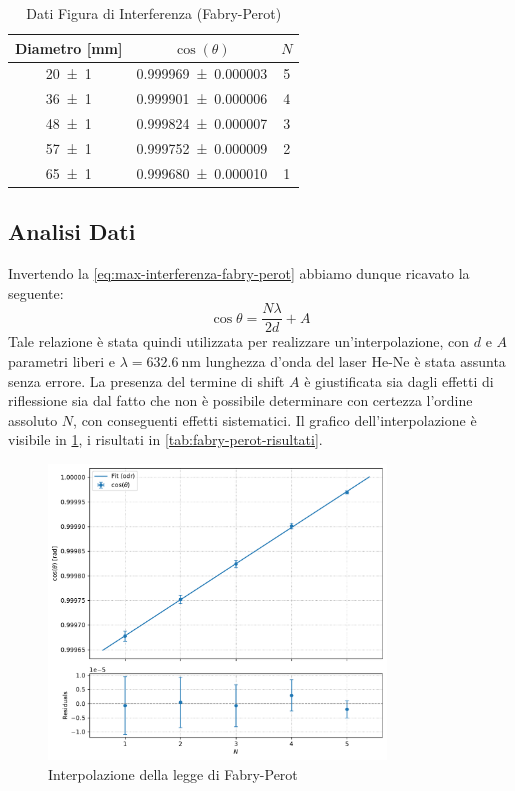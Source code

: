 \documentclass[a4paper]{article}
\begin{document}
\begin{table}[htbp]
\centering
\caption{Dati Figura di Interferenza (Fabry-Perot)}
\begin{tabular}{|c|c|c|}
\hline
Diametro [\si{\milli\meter}] & $\cos(\theta)$ & $N$ \\\hline\hline
\num{20 \pm 1} & \num{0.999969 \pm 0.000003}  & 5 \\
\num{36 \pm 1} & \num{0.999901 \pm 0.000006}  & 4 \\
\num{48 \pm 1} & \num{0.999824 \pm 0.000007}  & 3 \\
\num{57 \pm 1} & \num{0.999752 \pm 0.000009}  & 2 \\
\num{65 \pm 1} & \num{0.999680 \pm 0.000010}  & 1 \\
\hline
\end{tabular}
\label{tab:fabry-perot-dati}
\end{table}


\subsection{Analisi Dati}
Invertendo la \cref{eq:max-interferenza-fabry-perot} abbiamo dunque ricavato la seguente:
\[\cos \theta = \frac{N\lambda}{2d} + A\]
Tale relazione è stata quindi utilizzata per realizzare un'interpolazione,
con $d$ e $A$ parametri liberi e $\lambda=\SI{632.6}{\nano\meter}$ lunghezza d'onda del laser He-Ne è stata assunta senza errore. La presenza del termine di shift $A$ è giustificata sia dagli effetti di riflessione sia dal fatto che non è possibile determinare con certezza l'ordine assoluto $N$, con conseguenti effetti sistematici.
Il grafico dell'interpolazione è visibile in \cref{fig:fabry-perot-interpolazione}, i risultati in \cref{tab:fabry-perot-risultati}.

\begin{figure}[htbp]
\centering
\includegraphics[width=0.8\textwidth]{./grafici/fabry_perot_interferenza.pdf}
\caption{Interpolazione della legge di Fabry-Perot}
\label{fig:fabry-perot-interpolazione}
\end{figure}
\end{document}
